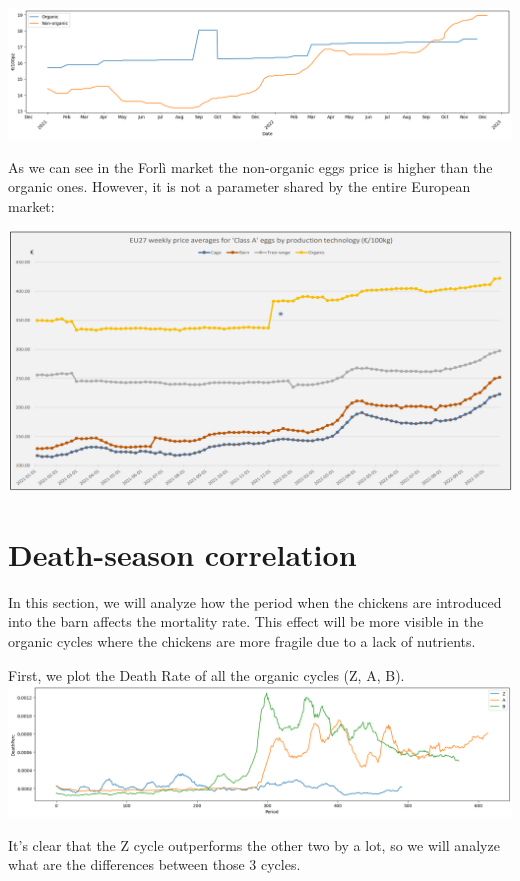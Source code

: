 \documentclass[11pt]{article}
\begin{document}
\includegraphics[width=150mm]{../Results/Eggs price/organic_vs_nonorganic.png}

As we can see in the Forlì market the non-organic eggs price is higher than the organic ones. However, it is not a parameter shared by the entire European market:

\includegraphics[width=150mm]{../Results/Eggs price/eu_eggs_price.png}

\section{Death-season correlation}
In this section, we will analyze how the period when the chickens are introduced into the barn affects the mortality rate. This effect will be more visible in the organic cycles where the chickens are more fragile due to a lack of nutrients.

First, we plot the Death Rate of all the organic cycles (Z, A, B).\newline
\includegraphics[width=\linewidth]{../Results/Comparison_Z_AB/Death.png}

It's clear that the Z cycle outperforms the other two by a lot, so we will analyze what are the differences between those 3 cycles.
\end{document}
